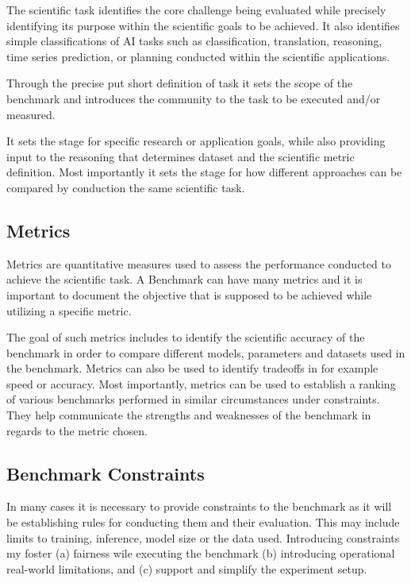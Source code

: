 The scientific task identifies the core challenge being evaluated while precisely identifying its purpose within the scientific goals to be achieved. 
It also identifies simple classifications of AI tasks such as classification, translation, reasoning, time series prediction, or planning conducted within the scientific applications.

Through the precise put short definition of task it sets the scope of the benchmark and introduces the community to the task to be executed and/or measured.

It sets the stage for specific research or application goals, while also providing input to the reasoning that determines dataset and the scientific metric definition.
Most importantly it sets the stage for how different approaches can be compared by conduction the same scientific task.

\subsection{Metrics}
\label{subsec:towards-metrics}

Metrics are quantitative measures used to assess the performance conducted to achieve the scientific task.
A Benchmark can have many metrics and it is important to document the objective that is supposed to be achieved while utilizing a specific metric.

The goal of such metrics includes to identify the scientific accuracy of the benchmark in order to compare different models, parameters and datasets used in the benchmark.
Metrics can also be used to identify tradeoffs in for example speed or accuracy.
Most importantly, metrics can be used to establish a ranking of various benchmarks performed in similar circumstances under constraints.
They help communicate the strengths and weaknesses of the benchmark in regards to the metric chosen.

\subsection{Benchmark Constraints}
\label{subsec:towards-constraints}

In many cases it is necessary to provide constraints to the benchmark as it will be establishing rules for conducting them and their evaluation.
This may include limits to training, inference, model size or the data used. 
Introducing constraints my foster (a) fairness wile executing the benchmark (b) introducing operational real-world limitations, and (c) support and simplify the experiment setup. 

